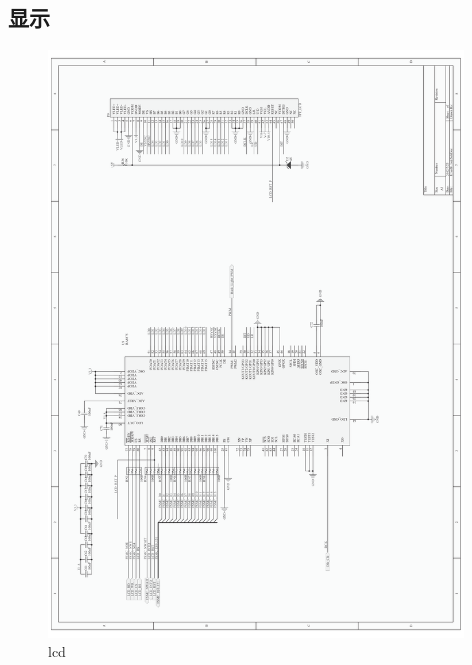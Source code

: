 \documentclass[titlepage]{article}
\begin{document}
 \subsection{显示}
 \begin{figure}[h]
  \centering
 \includegraphics[width=11cm]{lcd.pdf}
 \caption{lcd}
 \end{figure}

 \newpage
\end{document}

